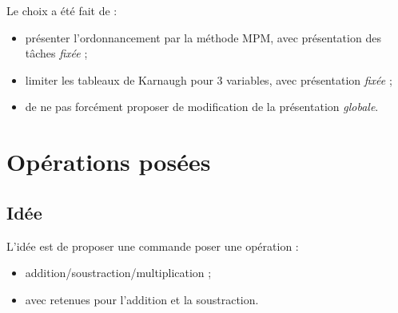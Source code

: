 \documentclass[french,a4paper,11pt]{article}
\begin{document}
{{\begin{noteblock}
Le choix a été fait de :

\begin{itemize}
	\item présenter l'ordonnancement par la méthode MPM, avec présentation des tâches \textit{fixée} ;
	\item limiter les tableaux de Karnaugh pour 3 variables, avec présentation \textit{fixée} ;
	\item de ne pas forcément proposer de modification de la présentation \textit{globale}.
\end{itemize}
\vspace*{-\baselineskip}\leavevmode
\end{noteblock}

\pagebreak

\section{Opérations posées}

\subsection{Idée}

\begin{tipblock}
L'idée est de proposer une commande poser une opération :

\begin{itemize}
	\item addition/soustraction/multiplication ;
	\item avec retenues pour l'addition et la soustraction.
\end{itemize}
\vspace*{-\baselineskip}\leavevmode
\end{tipblock}

\begin{DemoCode}
\end{DemoCode}

\begin{DemoCode}[]
\end{DemoCode}

\begin{DemoCode}[]
\end{DemoCode}

\begin{DemoCode}[]
\end{DemoCode}

}}
\end{document}

